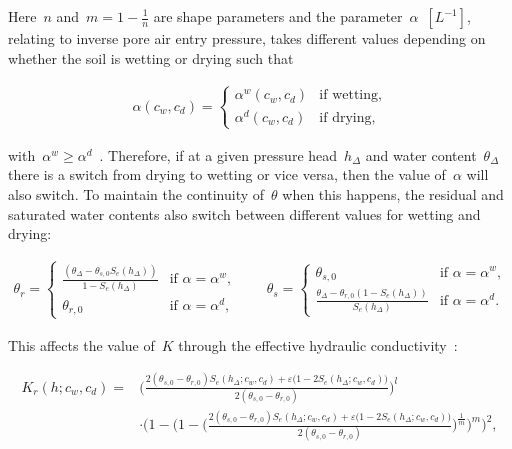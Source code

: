\documentclass[11pt,a4paper]{article}
\numberwithin{equation}{section}
\begin{document}
Here~$n$ and~$m=1-\frac{1}{n}$ are shape parameters and the parameter~$\alpha$~$[L^{-1}]$, relating to inverse pore air entry pressure, takes different values depending on whether the soil is wetting or drying such that
\begin{linenomath*}
	\begin{equation}\label{model: inverse air entry pressure head}
		\begin{aligned}
			\alpha(c_w, c_d) =
			\begin{cases}
				\alpha^w(c_w, c_d) &\text{if wetting,}\\
				\alpha^d(c_w, c_d) &\text{if drying,}
			\end{cases}
		\end{aligned}
	\end{equation}
\end{linenomath*}
with~$\alpha^w \geq \alpha^d$~\citep{kool1987development}. Therefore, if at a given pressure head~$h_\Delta$ and  water content~$\theta_\Delta$ there is a switch from drying to wetting or vice versa, then the value of~$\alpha$ will also switch. To maintain the continuity of~$\theta$ when this happens, the residual and saturated water contents also switch between different values for wetting and drying:
\begin{linenomath*}
	\begin{equation}\label{model: hysteretic residual and saturated}
		\begin{aligned}
			\theta_{r}= 
			\begin{cases}
				\frac{(\theta_\Delta - \theta_{s,0}S_e(h_\Delta))}{1- S_e(h_\Delta)} &\text{if }\alpha=\alpha^w,\\
				\theta_{r,0} &\text{if }\alpha=\alpha^d, 
			\end{cases}\qquad
			\theta_{s} =
			\begin{cases}
				\theta_{s,0} &\text{if }\alpha=\alpha^w,\\
				\frac{\theta_\Delta - \theta_{r,0}(1-S_e(h_\Delta))}{S_e(h_\Delta)}&\text{if }\alpha =\alpha^d.
			\end{cases}			
		\end{aligned}
	\end{equation}
\end{linenomath*}   
This affects the value 
of~$K$ through the effective hydraulic conductivity~\citep{mualem1976new, van1980closed}:
\begin{linenomath*}
	\begin{equation}\label{model: relative conductivity}
		\begin{aligned}
			K_r(h; c_w, c_d)
			=&
			\Bigg(\frac{2(\theta_{s, 0} - \theta_{r,0})S_e(h_\Delta; c_w, c_d) + \varepsilon\big(1-2S_e(h_\Delta; c_w, c_d)\big)}{2(\theta_{s,0} - \theta_{r,0})}\Bigg)^l\\
			&\cdot
			\Bigg(1 - \Bigg(1 - \Bigg(\frac{2(\theta_{s,0} - \theta_{r,0})S_e(h_\Delta; c_w, c_d) + \varepsilon\big(1-2S_e(h_\Delta; c_w, c_d)\big)}{2(\theta_{s,0} - \theta_{r,0})}\Bigg)^\frac{1}{m}\Bigg)^{m}\Bigg)^2,
		\end{aligned}
	\end{equation}
\end{linenomath*}
\end{document}
